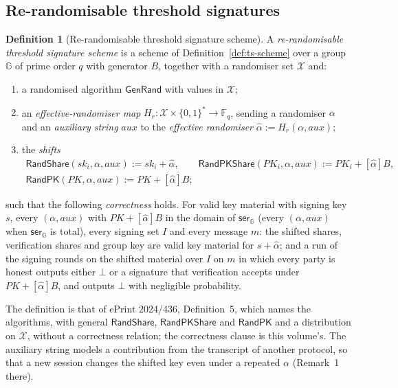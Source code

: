 \documentclass[11pt,a4paper]{article}
\theoremstyle{definition}
\newtheorem{definition}[theorem]{Definition}
\newcommand{\F}{\mathbb{F}}
\newcommand{\G}{\mathbb{G}}
\newcommand{\Fq}{\F_q}
\begin{document}
\subsection{Re-randomisable threshold signatures}\label{sec:rr-scheme}

\begin{definition}[Re-randomisable threshold signature scheme]
\label{def:rerand-ts}
A \emph{re-randomisable threshold signature scheme} is a scheme of
Definition~\ref{def:ts-scheme} over a group \(\G\) of prime order \(q\) with
generator \(B\), together with a randomiser set \(\mathcal{X}\) and:
\begin{enumerate}
\item a randomised algorithm \(\mathsf{GenRand}\) with values in
  \(\mathcal{X}\);
\item an \emph{effective-randomiser map}
  \(H_r \colon \mathcal{X} \times \{0,1\}^{*} \to \Fq\), sending a
  randomiser \(\alpha\) and an \emph{auxiliary string} \(\mathit{aux}\) to
  the \emph{effective randomiser}
  \(\hat{\alpha} := H_r(\alpha, \mathit{aux})\);
\item the \emph{shifts}
  \begin{gather*}
    \mathsf{RandShare}(\mathit{sk}_i, \alpha, \mathit{aux})
      := \mathit{sk}_i + \hat{\alpha} , \qquad
    \mathsf{RandPKShare}(\mathit{PK}_i, \alpha, \mathit{aux})
      := \mathit{PK}_i + [\hat{\alpha}]B , \\
    \mathsf{RandPK}(\mathit{PK}, \alpha, \mathit{aux})
      := \mathit{PK} + [\hat{\alpha}]B ;
  \end{gather*}
\end{enumerate}
such that the following \emph{correctness} holds. For valid key material
with signing key \(s\), every \((\alpha, \mathit{aux})\) with
\(\mathit{PK} + [\hat{\alpha}]B\) in the domain of \(\mathsf{ser}_{\G}\)
(every \((\alpha, \mathit{aux})\) when \(\mathsf{ser}_{\G}\) is total), every
signing set
\(I\) and every message \(m\): the shifted shares, verification shares and
group key are valid key material for \(s + \hat{\alpha}\); and a run of the
signing rounds on the shifted material over \(I\) on \(m\) in which every
party is honest outputs either \(\bot\) or a signature that verification
accepts under \(\mathit{PK} + [\hat{\alpha}]B\), and outputs \(\bot\) with
negligible probability.
\end{definition}

The definition is that of ePrint 2024/436, Definition~5, which names the
algorithms, with general \(\mathsf{RandShare}\), \(\mathsf{RandPKShare}\)
and \(\mathsf{RandPK}\) and a distribution on \(\mathcal{X}\), without a
correctness relation; the correctness clause is this volume's. The
auxiliary string models a contribution from the transcript of another
protocol, so that a new session changes the shifted key even under a
repeated \(\alpha\) (Remark~1 there).
\end{document}

